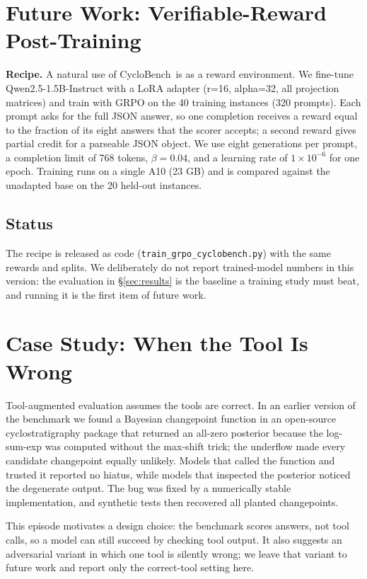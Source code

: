 \documentclass[10pt]{article}
\newcommand{\method}{CycloBench}
\begin{document}
\section{Future Work: Verifiable-Reward Post-Training}
\label{sec:grpo}
\textbf{Recipe.} A natural use of \method\ is as a reward environment. We fine-tune Qwen2.5-1.5B-Instruct with a LoRA adapter (r=16, alpha=32,
all projection matrices) and train with GRPO on the 40 training instances (320 prompts).
Each prompt asks for the full JSON answer, so one completion receives a reward equal to the
fraction of its eight answers that the scorer accepts; a second reward gives partial credit
for a parseable JSON object. We use eight generations per prompt, a completion limit of 768
tokens, $\beta=0.04$, and a learning rate of $1\times10^{-6}$ for one epoch. Training runs on
a single A10 (23 GB) and is compared against the unadapted base on the 20 held-out instances.


\subsection{Status}
The recipe is released as code (\texttt{train\_grpo\_cyclobench.py}) with the same rewards and
splits. We deliberately do not report trained-model numbers in this version: the evaluation in
\S\ref{sec:results} is the baseline a training study must beat, and running it is the first item
of future work.

\section{Case Study: When the Tool Is Wrong}
\label{sec:case}
Tool-augmented evaluation assumes the tools are correct. In an earlier version of the benchmark
we found a Bayesian changepoint function in an open-source cyclostratigraphy package that
returned an all-zero posterior because the log-sum-exp was computed without the max-shift
trick; the underflow made every candidate changepoint equally unlikely. Models that called the
function and trusted it reported no hiatus, while models that inspected the posterior noticed
the degenerate output. The bug was fixed by a numerically stable implementation, and synthetic
tests then recovered all planted changepoints.

This episode motivates a design choice: the benchmark scores answers, not tool calls, so a model
can still succeed by checking tool output. It also suggests an adversarial variant in which one
tool is silently wrong; we leave that variant to future work and report only the correct-tool
setting here.
\end{document}
